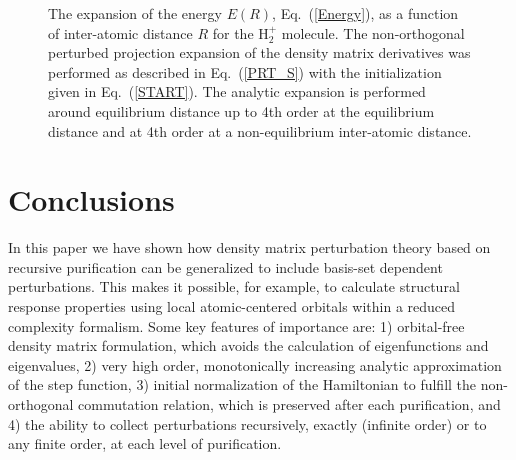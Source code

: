\documentclass[twocolumn,showpacs,preprintnumbers,amsmath,amssymb]{revtex4}
\begin{document}
                                                                                               
\begin{figure}[t]
\caption{\label{H2}
The expansion of the energy $E(R)$, Eq.\ (\ref{Energy}), as a function of inter-atomic 
distance $R$ for the H$_2^+$ molecule.
The non-orthogonal perturbed projection expansion of the density matrix derivatives was
performed as described in Eq.\ (\ref{PRT_S}) with the initialization given in
Eq.\ (\ref{START}). The analytic expansion is performed around equilibrium distance
up to 4th order at the equilibrium distance and at 4th order at a
non-equilibrium inter-atomic distance.}
\end{figure}

\section{Conclusions}

In this paper we have shown how density matrix perturbation theory based on recursive purification 
can be generalized to include basis-set dependent perturbations. This makes
it possible, for example, to calculate structural response properties 
using local atomic-centered orbitals within a reduced complexity formalism. 
Some key features of importance are: 1) orbital-free density matrix formulation,
which avoids the calculation of eigenfunctions and eigenvalues, 2) very high order, monotonically 
increasing analytic approximation of the step function, 3) initial normalization of the Hamiltonian 
to fulfill the non-orthogonal commutation relation, which is preserved after each purification, 
and 4) the ability to collect perturbations recursively, exactly (infinite order) or to any finite 
order, at each level of purification.
\end{document}
